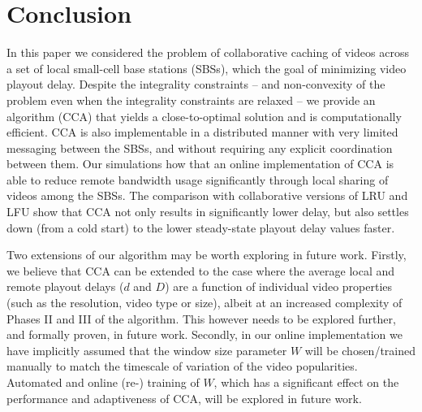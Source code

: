 \documentclass[conference]{IEEEtran}
\begin{document}
\section{Conclusion}
\label{sec:Conclusion}
In this paper we considered the problem of collaborative caching of videos across a set of local small-cell base stations (SBSs), which the goal of minimizing video playout delay. Despite the integrality constraints -- and non-convexity of the problem even when the integrality constraints are relaxed -- we provide an algorithm (CCA) that yields a close-to-optimal solution and is computationally efficient. CCA is also implementable in a distributed manner with very limited messaging between the SBSs, and without requiring any explicit coordination between them. Our simulations how that an online implementation of CCA is able to reduce remote bandwidth usage significantly through local sharing of videos among the SBSs. The comparison with collaborative versions of LRU and LFU show that CCA not only results in significantly lower delay, but also settles down (from a cold start) to the lower steady-state playout delay values faster. 

Two extensions of our algorithm may be worth exploring in future work. Firstly, we believe that CCA can be extended to the case where the average local and remote playout delays ($d$ and $D$) are a function of individual video properties (such as the resolution, video type or size), albeit at an increased complexity of Phases II and III of the algorithm. This however needs to be explored further, and formally proven, in future work. Secondly, in our online implementation we have implicitly assumed that the window size parameter $W$ will be chosen/trained manually to match the timescale of variation of the video popularities. Automated and online (re-) training of $W$, which has a significant effect on the performance and adaptiveness of CCA, will be explored in future work. 





\end{document}
